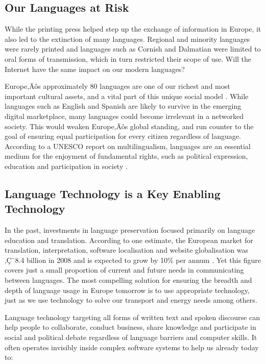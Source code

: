 \begin{multicols}{2}
\subsection{Our Languages at Risk}

While the printing press helped step up the exchange of information in Europe, it also led to the extinction of many languages. Regional and minority languages were rarely printed and languages such as Cornish and Dalmatian were limited to oral forms of transmission, which in turn restricted their scope of use. Will the Internet have the same impact on our modern languages?


Europe‚Äôs approximately 80 languages are one of our richest and most important cultural assets, and a vital part of this unique social model \cite{EC2}. While languages such as English and Spanish are likely to survive in the emerging digital marketplace, many languages could become irrelevant in a networked society. This would weaken Europe‚Äôs global standing, and run counter to the goal of ensuring equal participation for every citizen regardless of language. According to a UNESCO report on multilingualism, languages are an essential medium for the enjoyment of fundamental rights, such as political expression, education and participation in society \cite{Unesco1}.

\subsection{Language Technology is a Key Enabling Technology}


In the past, investments in language preservation focused primarily on language education and translation. According to one estimate, the European market for translation, interpretation, software localisation and website globalisation was ‚Ç¨8.4 billion in 2008 and is expected to grow by 10\% per annum \cite{EC3}. Yet this figure covers just a small proportion of current and future needs in communicating between languages. The most compelling solution for ensuring the breadth and depth of language usage in Europe tomorrow is to use appropriate technology, just as we use technology to solve our transport and energy needs among others.

Language technology targeting all forms of written text and spoken discourse can help people to collaborate, conduct business, share knowledge and participate in social and political debate regardless of language barriers and computer skills. It often operates invisibly inside complex software systems to help us already today to:


\end{multicols}
